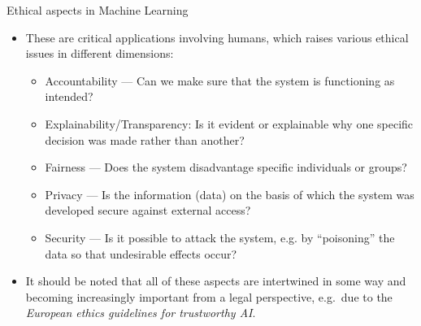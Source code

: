 \begin{vbframe}{Ethical aspects in Machine Learning}
%	
	\begin{itemize}
%		
		\item These are critical applications involving humans, which raises various ethical issues in different dimensions:
%		
		\begin{itemize}
			\item Accountability --- Can we make sure that the system is functioning as intended?
%			
			\item Explainability/Transparency: Is it evident or explainable why one specific decision was made rather than another?
%			
			\item Fairness --- Does the system disadvantage specific individuals or groups?
%			
			\item Privacy --- Is the information (data) on the basis of which the system was developed secure against external access?
%			
			\item Security --- Is it possible to attack the system, e.g. by ``poisoning'' the data so that undesirable effects occur?
		\end{itemize}
%	
	\item It should be noted that all of these aspects are intertwined in some way and becoming increasingly important from a legal perspective, e.g.\ due to the \emph{European ethics guidelines for trustworthy AI}.
%
	\end{itemize}
%
\end{vbframe}

